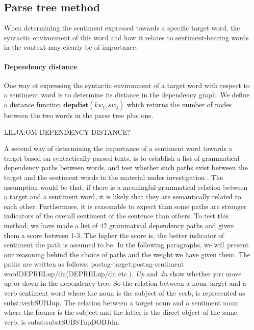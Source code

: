 \documentclass[11pt]{article}
\begin{document}
\subsection{Parse tree method}
\label{sec:dp}
When determining the sentiment expressed towards a specific target word, the syntactic environment of this word and how it relates to sentiment-bearing words in the context may clearly be of importance. 

\paragraph{Dependency distance}
One way of expressing the syntactic environment of a target word with respect to a sentiment word is to determine its distance in the dependency graph. We define a distance function $\mathbf{depdist}(kw_i, sw_{j})$ which returns the number of nodes between the two words in the parse tree plus one.

LILJA:OM DEPENDENCY DISTANCE?

A second way of determining the importance of a sentiment word towards a target based on syntactically parsed texts, is to establish a list of grammatical dependency paths between words, and test whether such paths exist between the target and the sentiment words in the material under investigation \cite{Jiang11}. The assumption would be that, if there is a meaningful grammatical relation between a target and a sentiment word, it is likely that they are semantically related to each other. Furthermore, it is reasonable to expect than some paths are stronger indicators of the overall sentiment of the sentence than others. To test this method, we have made a list of 42 grammatical dependency paths and given them a score between 1-3. The higher the score is, the better indicator of sentiment the path is assumed to be. In the following paragraphs, we will present our reasoning behind the choice of paths and the weight we have given them. The paths are written as follows: postag-target:postag-sentiment word{\textunderscore}{\textunderscore}DEPREL{\textunderscore}up/dn({\textunderscore}{\textunderscore}DEPREL{\textunderscore}up/dn etc.). \emph{Up} and \emph{dn} show whether you move up or down in the dependency tree. So the relation between a noun target and a verb sentiment word where the noun is the subject of the verb, is represented as subst:verb{\textunderscore}{\textunderscore}SUBJ{\textunderscore}up. The relation between a target noun and a sentiment noun where the former is the subject and the latter is the direct object of the same verb, is subst:subst{\textunderscore}{\textunderscore}SUBST{\textunderscore}up{\textunderscore}{\textunderscore}DOBJ{\textunderscore}dn.
\end{document}
